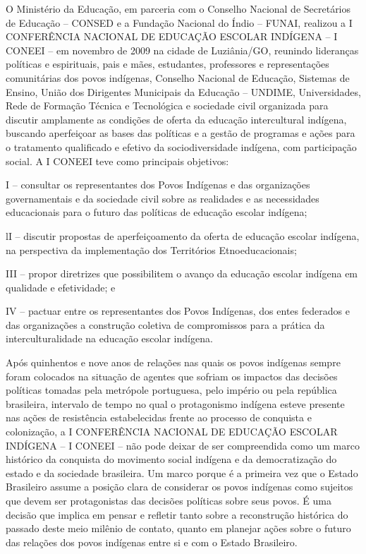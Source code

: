 \documentclass[
]{book}
\begin{document}
O Ministério da Educação, em parceria com o Conselho Nacional de Secretários de Educação -- CONSED e a Fundação Nacional do Índio -- FUNAI, realizou a I CONFERÊNCIA NACIONAL DE EDUCAÇÃO ESCOLAR INDÍGENA -- I CONEEI -- em novembro de 2009 na cidade de Luziânia/GO, reunindo lideranças políticas e espirituais, pais e mães, estudantes, professores e representações comunitárias dos povos indígenas, Conselho Nacional de Educação, Sistemas de Ensino, União dos Dirigentes Municipais da Educação -- UNDIME, Universidades, Rede de Formação Técnica e Tecnológica e sociedade civil organizada para discutir amplamente as condições de oferta da educação intercultural indígena, buscando aperfeiçoar as bases das políticas e a gestão de programas e ações para o tratamento qualificado e efetivo da sociodiversidade indígena, com participação social. A I CONEEI teve como principais objetivos:

I -- consultar os representantes dos Povos Indígenas e das organizações governamentais e da sociedade civil sobre as realidades e as necessidades educacionais para o futuro das políticas de educação escolar indígena;

lI -- discutir propostas de aperfeiçoamento da oferta de educação escolar indígena, na perspectiva da implementação dos Territórios Etnoeducacionais;

III -- propor diretrizes que possibilitem o avanço da educação escolar indígena em qualidade e efetividade; e

IV -- pactuar entre os representantes dos Povos Indígenas, dos entes federados e das organizações a construção coletiva de compromissos para a prática da interculturalidade na educação escolar indígena.

Após quinhentos e nove anos de relações nas quais os povos indígenas sempre foram colocados na situação de agentes que sofriam os impactos das decisões políticas tomadas pela metrópole portuguesa, pelo império ou pela república brasileira, intervalo de tempo no qual o protagonismo indígena esteve presente nas ações de resistência estabelecidas frente ao processo de conquista e colonização, a I CONFERÊNCIA NACIONAL DE EDUCAÇÃO ESCOLAR INDÍGENA -- I CONEEI -- não pode deixar de ser compreendida como um marco histórico da conquista do movimento social indígena e da democratização do estado e da sociedade brasileira. Um marco porque é a primeira vez que o Estado Brasileiro assume a posição clara de considerar os povos indígenas como sujeitos que devem ser protagonistas das decisões políticas sobre seus povos. É uma decisão que implica em pensar e refletir tanto sobre a reconstrução histórica do passado deste meio milênio de contato, quanto em planejar ações sobre o futuro das relações dos povos indígenas entre si e com o Estado Brasileiro.
\end{document}
